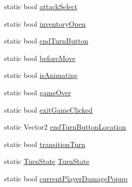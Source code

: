 \begin{DoxyCompactItemize}
\item 
static bool \hyperlink{class_model_1_1_game_state_a6bad6fb7894df05450a002190dd37f89}{attack\+Select}
\item 
static bool \hyperlink{class_model_1_1_game_state_ae8b8bcd9dbbed13dc893c5c4319e7435}{inventory\+Open}
\item 
static bool \hyperlink{class_model_1_1_game_state_ae55aa686aaf5841657344fdc178c92d5}{end\+Turn\+Button}
\item 
static bool \hyperlink{class_model_1_1_game_state_af546cfa01e29773b5260cd6bfe8132b7}{before\+Move}
\item 
static bool \hyperlink{class_model_1_1_game_state_ac8c6a53641aafa5d57a9dff8f958a904}{is\+Animating}
\item 
static bool \hyperlink{class_model_1_1_game_state_a2274be2a54b2c7b70b81213a07804b75}{game\+Over}
\item 
static bool \hyperlink{class_model_1_1_game_state_a0ee0eff828bc31ce69967d7ef04588b8}{exit\+Game\+Clicked}
\item 
static Vector2 \hyperlink{class_model_1_1_game_state_ae092b0d0e2c881a590e5798fd39d7798}{end\+Turn\+Button\+Location}
\item 
static bool \hyperlink{class_model_1_1_game_state_a1c674970c8810751fe7e478b3cb790d4}{transition\+Turn}
\item 
static \hyperlink{namespace_model_abc9786019e8deab9844b28c3d9c58f86}{Turn\+State} \hyperlink{class_model_1_1_game_state_a07052b158febe5c1f05a6b8bc3426775}{Turn\+State}
\item 
static bool \hyperlink{class_model_1_1_game_state_a1c8543e79d3bb6fdfb705b0428d98bce}{current\+Player\+Damage\+Popup}

\end{DoxyCompactItemize}
